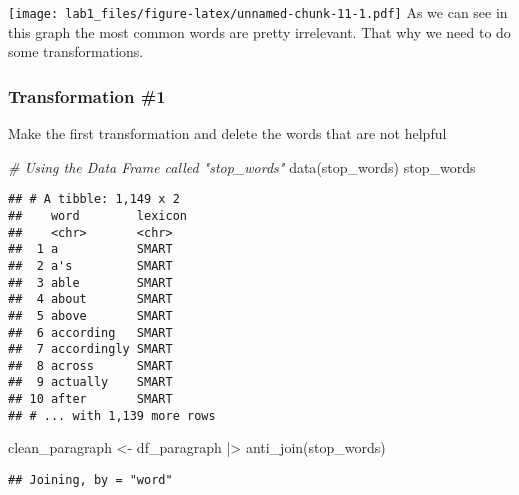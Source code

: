 \documentclass[
]{article}
\newenvironment{Shaded}{\begin{snugshade}}{\end{snugshade}}
\newcommand{\CommentTok}[1]{\textcolor[rgb]{0.56,0.35,0.01}{\textit{#1}}}
\newcommand{\FunctionTok}[1]{\textcolor[rgb]{0.00,0.00,0.00}{#1}}
\newcommand{\NormalTok}[1]{#1}
\newcommand{\OtherTok}[1]{\textcolor[rgb]{0.56,0.35,0.01}{#1}}
\newcommand{\SpecialCharTok}[1]{\textcolor[rgb]{0.00,0.00,0.00}{#1}}
\begin{document}
\texttt{[image: lab1\_files/figure-latex/unnamed-chunk-11-1.pdf]} As we
can see in this graph the most common words are pretty irrelevant. That
why we need to do some transformations.

\hypertarget{transformation-1}{%
\subsubsection{Transformation \#1}\label{transformation-1}}

Make the first transformation and delete the words that are not helpful

\begin{Shaded}
\begin{Highlighting}[]
\CommentTok{\# Using the Data Frame called "stop\_words"}
\FunctionTok{data}\NormalTok{(stop\_words)}
\NormalTok{stop\_words}
\end{Highlighting}
\end{Shaded}

\begin{verbatim}
## # A tibble: 1,149 x 2
##    word        lexicon
##    <chr>       <chr>  
##  1 a           SMART  
##  2 a's         SMART  
##  3 able        SMART  
##  4 about       SMART  
##  5 above       SMART  
##  6 according   SMART  
##  7 accordingly SMART  
##  8 across      SMART  
##  9 actually    SMART  
## 10 after       SMART  
## # ... with 1,139 more rows
\end{verbatim}

\begin{Shaded}
\begin{Highlighting}[]
\NormalTok{clean\_paragraph }\OtherTok{\textless{}{-}}\NormalTok{ df\_paragraph }\SpecialCharTok{|\textgreater{}} 
  \FunctionTok{anti\_join}\NormalTok{(stop\_words)}
\end{Highlighting}
\end{Shaded}

\begin{verbatim}
## Joining, by = "word"
\end{verbatim}
\end{document}

